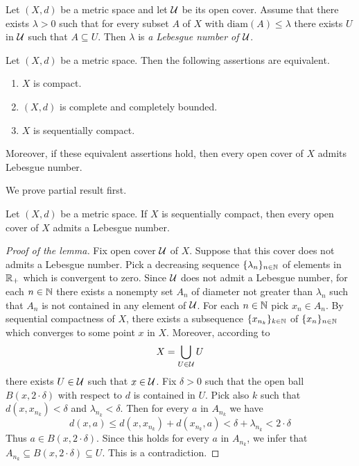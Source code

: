 \begin{definition}
Let $(X,d)$ be a metric space and let ${\mathcal U}$ be its open cover. Assume that there exists $\lambda > 0$ such that for every subset $A$ of $X$ with $\mathrm{diam}(A) \leq \lambda$ there exists $U$ in ${\mathcal U}$ such that $A\subseteq U$. Then $\lambda$ is \textit{a Lebesgue number of ${\mathcal U}$}.
\end{definition}

\begin{theorem}\label{theorem:characterization_of_compactness_for_metric_spaces}
Let $(X,d)$ be a metric space. Then the following assertions are equivalent.
\begin{enumerate}[label=\emph{\textbf{(\roman*)}}, leftmargin=*]
\item $X$ is compact.
\item $(X,d)$ is complete and completely bounded. 
\item $X$ is sequentially compact.
\end{enumerate}
Moreover, if these equivalent assertions hold, then every open cover of $X$ admits Lebesgue number.
\end{theorem}
\noindent
We prove partial result first.

\begin{lemma}\label{lemma:sequentially_compact_implies_Lebesgue_number}
Let $(X,d)$ be a metric space. If $X$ is sequentially compact, then every open cover of $X$ admits a Lebesgue number.
\end{lemma}
\begin{proof}[Proof of the lemma]
Fix open cover ${\mathcal U}$ of $X$. Suppose that this cover does not admits a Lebesgue number. Pick a decreasing sequence $\{\lambda_n\}_{n\in {\mathbb N}}$ of elements in ${\mathbb R}_+$ which is convergent to zero. Since ${\mathcal U}$ does not admit a Lebesgue number, for each $n\in {\mathbb N}$ there exists a nonempty set $A_{n}$ of diameter not greater than $\lambda_n$ such that $A_n$ is not contained in any element of ${\mathcal U}$. For each $n\in {\mathbb N}$ pick $x_n\in A_n$. By sequential compactness of $X$, there exists a subsequence $\{x_{n_k}\}_{k\in {\mathbb N}}$ of $\{x_n\}_{n\in {\mathbb N}}$ which converges to some point $x$ in $X$. Moreover, according to
$$X = \bigcup_{U\in {\mathcal U}} U$$
there exists $U\in {\mathcal U}$ such that $x\in {\mathcal U}$. Fix $\delta > 0$ such that the open ball $B(x,2\cdot \delta)$ with respect to $d$ is contained in $U$. Pick also $k$ such that $d(x,x_{n_k}) < \delta$ and $\lambda_{n_k} < \delta$. Then for every $a$ in $A_{n_k}$ we have
$$d(x,a) \leq d(x,x_{n_k}) + d(x_{n_k},a) < \delta + \lambda_{n_k} < 2\cdot \delta$$
Thus $a\in B(x,2\cdot \delta)$. Since this holds for every $a$ in $A_{n_k}$, we infer that $A_{n_k}\subseteq B(x,2\cdot \delta)\subseteq U$. This is a contradiction. 
\end{proof}

